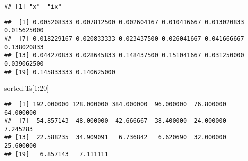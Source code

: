 \documentclass[
]{article}
\newenvironment{Shaded}{\begin{snugshade}}{\end{snugshade}}
\newcommand{\CommentTok}[1]{\textcolor[rgb]{0.56,0.35,0.01}{\textit{#1}}}
\newcommand{\DataTypeTok}[1]{\textcolor[rgb]{0.13,0.29,0.53}{#1}}
\newcommand{\DecValTok}[1]{\textcolor[rgb]{0.00,0.00,0.81}{#1}}
\newcommand{\KeywordTok}[1]{\textcolor[rgb]{0.13,0.29,0.53}{\textbf{#1}}}
\newcommand{\NormalTok}[1]{#1}
\newcommand{\OperatorTok}[1]{\textcolor[rgb]{0.81,0.36,0.00}{\textbf{#1}}}
\newcommand{\StringTok}[1]{\textcolor[rgb]{0.31,0.60,0.02}{#1}}
\begin{document}
\begin{Shaded}
\end{Shaded}

\begin{verbatim}
## [1] "x"  "ix"
\end{verbatim}

\begin{Shaded}
\end{Shaded}

\begin{verbatim}
##  [1] 0.005208333 0.007812500 0.002604167 0.010416667 0.013020833 0.015625000
##  [7] 0.018229167 0.020833333 0.023437500 0.026041667 0.041666667 0.138020833
## [13] 0.044270833 0.028645833 0.148437500 0.151041667 0.031250000 0.039062500
## [19] 0.145833333 0.140625000
\end{verbatim}

\begin{Shaded}
\begin{Highlighting}[]
\NormalTok{sorted.Ts[}\DecValTok{1}\OperatorTok{:}\DecValTok{20}\NormalTok{]}
\end{Highlighting}
\end{Shaded}

\begin{verbatim}
##  [1] 192.000000 128.000000 384.000000  96.000000  76.800000  64.000000
##  [7]  54.857143  48.000000  42.666667  38.400000  24.000000   7.245283
## [13]  22.588235  34.909091   6.736842   6.620690  32.000000  25.600000
## [19]   6.857143   7.111111
\end{verbatim}
\end{document}
